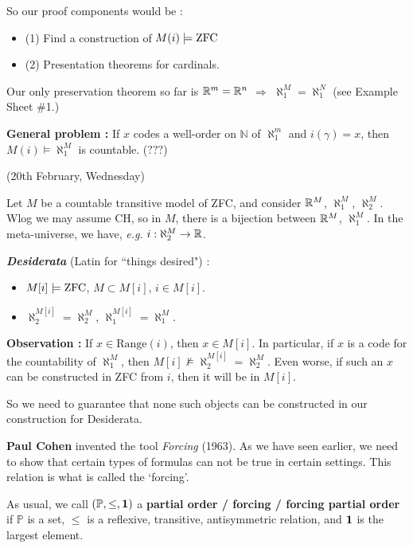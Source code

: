 \documentclass[12pt,a4paper]{article}
\renewenvironment{i}
{\begin{itemize} 
	}%
	{\end{itemize}
}
\begin{document}
\quad So our proof components would be :
\begin{i}
\item[(1)] Find a construction of $M(i) \models \text{ZFC}$
\item[(2)] Presentation theorems for cardinals.
\end{i}
Our only preservation theorem so far is $\mathbb{R}^m = \mathbb{R}^n$ $\Rightarrow$ $\aleph_1^M = \aleph_1^N$ (see Example Sheet \#1.)
\s

\textbf{General problem :} If $x$ codes a well-order on $\mathbb{N}$ of $\aleph_1^m$ and $i(\gamma) = x$, then $M(i) \models \aleph_1^M$ is countable. ($???$)


\newday

(20th February, Wednesday)
\s

Let $M$ be a countable transitive model of ZFC, and consider $\mathbb{R}^M$, $\aleph^M_1$, $\aleph^M_2$.  Wlog we may assume CH, so in $M$, there is a bijection between $\mathbb{R}^M$, $\aleph^M_1$. In the meta-universe, we have, \textit{e.g.} $i: \aleph_2^M \rightarrow \mathbb{R}$.
\s

\textbf{\textit{Desiderata} } (Latin for ``things desired") : 
\begin{i}
\item $M[i] \models \text{ZFC}$, $M\subset M[i]$, $i\in M[i]$.
\item $\aleph^{M[i]}_2 = \aleph_2^M$, $\aleph_1^{M[i]} = \aleph_1^M$.
\end{i}
\s

\textbf{Observation :} If $x\in \text{Range}(i)$, then $x\in M[i]$. In particular, if $x$ is a code for the countability of $\aleph_1^M$, then $M[i] \not\models \aleph_2^{M[i]} = \aleph_2^M$. Even worse, if such an $x$ can be constructed in ZFC from $i$, then it will be in $M[i]$.
\s

So we need to guarantee that none such objects can be constructed in our construction for Desiderata.
\s

\textbf{Paul Cohen} invented the tool \emph{Forcing} (1963). As we have seen earlier, we need to show that certain types of formulas can not be true in certain settings. This relation is what is called the `forcing'. 
\s

 As usual, we call $(\mathbb{P}, \leq, \bm{1})$ a \textbf{partial order / forcing / forcing partial order} if $\mathbb{P}$ is a set, $\leq$ is a reflexive, transitive, antisymmetric relation, and $\bm{1}$ is the largest element.
\end{document}
